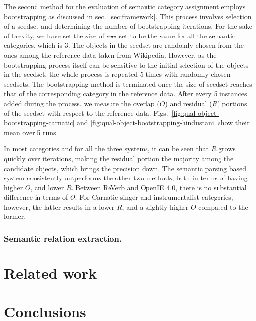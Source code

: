 \documentclass{llncs}
\begin{document}
The second method for the evaluation of semantic category assignment employs bootstrapping as discussed in sec.~\ref{sec:framework}. This process involves selection of a seedset and determining the number of bootstrapping iterations. For the sake of brevity, we have set the size of seedset to be the same for all the semantic categories, which is 3. The objects in the seedset are randomly chosen from the ones among the reference data taken from Wikipedia. However, as the bootstrapping process itself can be sensitive to the initial selection of the objects in the seedset, the whole process is repeated 5 times with randomly chosen seedsets. The bootstrapping method is terminated once the size of seedset reaches that of the corresponding category in the reference data. After every 5 instances added during the process, we measure the overlap ($O$) and residual ($R$) portions of the seedset with respect to the reference data.  Figs.~\ref{fig:qual-object-bootstrapping-carnatic} and \ref{fig:qual-object-bootstrapping-hindustani} show their mean over 5 runs. 

In most categories and for all the three systems, it can be seen that $R$ grows quickly over iterations, making the residual portion the majority among the candidate objects, which brings the precision down. The semantic parsing based system consistently outperforms the other two methods, both in terms of having higher $O$, and lower $R$. Between ReVerb and OpenIE 4.0, there is no substantial difference in terms of $O$. For Carnatic singer and instrumentalist categories, however, the latter results in a lower $R$, and a slightly higher $O$ compared to the former.



\subsubsection{Semantic relation extraction.}

\section{Related work}



\section{Conclusions}


\renewcommand\bibname{References}


%
\end{document}
